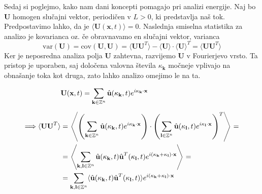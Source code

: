\documentclass[mat2, tisk]{fmfdelo}
\newcommand{\Z}{\mathbb Z}
\newcommand{\bd}{\textbf}
\begin{document}
Sedaj si poglejmo, kako nam dani koncepti pomagajo pri analizi 
energije. Naj bo $\bd{U}$  homogen slučajni vektor, periodičen v $L>0$, ki predstavlja naš tok. 
Predpostavimo lahko, da je $\langle \bd{U}(\bd{x}, t) \rangle = 0$. Naslednja 
smiselna statistika za analizo je kovarianca oz. če obravnavamo en 
slučajni vektor, varianca 
$$
\text{var}(\bd{U}) = \text{cov}(\bd{U}, \bd{U}) = \langle \bd{U} \bd{U}^T \rangle - \langle \bd{U} \rangle \cdot \langle \bd{U} \rangle^T = \langle \bd{U} \bd{U}^T \rangle
$$
Ker je neposredna analiza polja \bd{U} zahtevna, razvijemo \bd{U}
v Fourierjevo vrsto. Ta pristop je uporaben, saj določena valovna 
števila $\bd{$\kappa$}_\bd{k}$ močneje vplivajo na obnašanje toka kot 
druga, zato lahko analizo omejimo le na ta. 

\begin{align*}
&\bd{U}(\bd{x}, t) = \sum_{\bd{k}\in \Z^{n}} \hat{\bd{u}}(\bd{\text{$\kappa$}}_\bd{k}, t) e^{i\bd{\text{$\kappa$}}_\bd{k} \cdot \bd{x}}\\[2mm]
\Longrightarrow \langle \bd{U} \bd{U}^T\rangle &= \left\langle \left(\sum_{\bd{k}\in \Z^{n}} \hat{\bd{u}}(\bd{\text{$\kappa$}}_\bd{k}, t) e^{i\bd{\text{$\kappa$}}_\bd{k} \cdot \bd{x}}\right) \cdot \left(\sum_{\bd{l}\in \Z^{n}} \hat{\bd{u}}(\bd{\text{$\kappa$}}_\bd{l}, t) e^{i\bd{\text{$\kappa$}}_\bd{l} \cdot \bd{x}}\right)^T \right\rangle = \\
&= \left\langle \sum_{\bd{k}, \bd{l}\in \Z^{n}} \hat{\bd{u}}(\bd{\text{$\kappa$}}_\bd{k}, t) \hat{\bd{u}}^T(\bd{\text{$\kappa$}}_\bd{l}, t) e^{i(\bd{\text{$\kappa$}}_\bd{k} + \bd{\text{$\kappa$}}_\bd{l})\cdot \bd{x}} \right\rangle = \\
&=  \sum_{\bd{k}, \bd{l}\in \Z^{n}} \langle \hat{\bd{u}}(\bd{\text{$\kappa$}}_\bd{k}, t) \hat{\bd{u}}^T(\bd{\text{$\kappa$}}_\bd{l}, t) \rangle e^{i(\bd{\text{$\kappa$}}_\bd{k} + \bd{\text{$\kappa$}}_\bd{l})\cdot \bd{x}} 
\end{align*}
\end{document}
